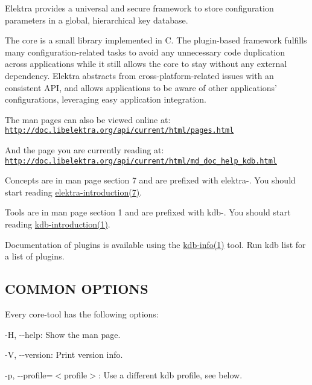 Elektra provides a universal and secure framework to store configuration parameters in a global, hierarchical key database.

The core is a small library implemented in C. The plugin-\/based framework fulfills many configuration-\/related tasks to avoid any unnecessary code duplication across applications while it still allows the core to stay without any external dependency. Elektra abstracts from cross-\/platform-\/related issues with an consistent A\+P\+I, and allows applications to be aware of other applications' configurations, leveraging easy application integration.

The man pages can also be viewed online at\+: \href{http://doc.libelektra.org/api/current/html/pages.html}{\tt http\+://doc.\+libelektra.\+org/api/current/html/pages.\+html}

And the page you are currently reading at\+: \href{http://doc.libelektra.org/api/current/html/md_doc_help_kdb.html}{\tt http\+://doc.\+libelektra.\+org/api/current/html/md\+\_\+doc\+\_\+help\+\_\+kdb.\+html}

Concepts are in man page section 7 and are prefixed with {\ttfamily elektra-\/}. You should start reading \hyperlink{md_doc_help_elektra-introduction_doc_help_elektra-introduction_md}{elektra-\/introduction(7)}.

Tools are in man page section 1 and are prefixed with {\ttfamily kdb-\/}. You should start reading \hyperlink{doc_help_kdb-introduction_md}{kdb-\/introduction(1)}.

Documentation of plugins is available using the \hyperlink{md_doc_help_kdb-info_doc_help_kdb-info_md}{kdb-\/info(1)} tool. Run {\ttfamily kdb list} for a list of plugins.

\subsection*{C\+O\+M\+M\+O\+N O\+P\+T\+I\+O\+N\+S}

Every core-\/tool has the following options\+:


\begin{DoxyItemize}
\item {\ttfamily -\/\+H}, {\ttfamily -\/-\/help}\+: Show the man page.
\item {\ttfamily -\/\+V}, {\ttfamily -\/-\/version}\+: Print version info.
\item {\ttfamily -\/p}, {\ttfamily -\/-\/profile}=$<$profile$>$\+: Use a different kdb profile, see below.
\end{DoxyItemize}

